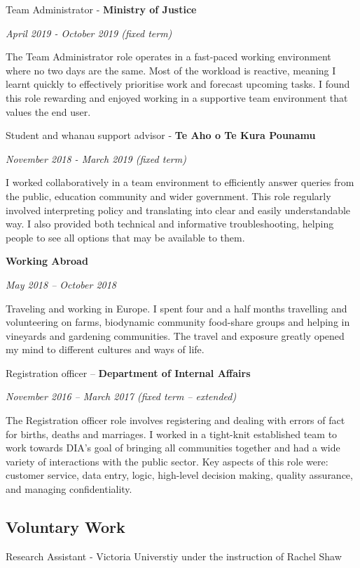 \documentclass[11pt,a4paper,]{moderncv}
\begin{document}
Team Administrator - \textbf{Ministry of Justice} ~

\emph{April 2019 - October 2019 (fixed term)}

The Team Administrator role operates in a fast-paced working environment
where no two days are the same. Most of the workload is reactive,
meaning I learnt quickly to effectively prioritise work and forecast
upcoming tasks. I found this role rewarding and enjoyed working in a
supportive team environment that values the end user.

Student and whanau support advisor - \textbf{Te Aho o Te Kura Pounamu} ~

\emph{November 2018 - March 2019 (fixed term)}

I worked collaboratively in a team environment to efficiently answer
queries from the public, education community and wider government. This
role regularly involved interpreting policy and translating into clear
and easily understandable way. I also provided both technical and
informative troubleshooting, helping people to see all options that may
be available to them.

\textbf{Working Abroad} ~

\emph{May 2018 -- October 2018}

Traveling and working in Europe. I spent four and a half months
travelling and volunteering on farms, biodynamic community food-share
groups and helping in vineyards and gardening communities. The travel
and exposure greatly opened my mind to different cultures and ways of
life.

Registration officer -- \textbf{Department of Internal Affairs} ~

\emph{November 2016 -- March 2017 (fixed term -- extended)}

The Registration officer role involves registering and dealing with
errors of fact for births, deaths and marriages. I worked in a
tight-knit established team to work towards DIA's goal of bringing all
communities together and had a wide variety of interactions with the
public sector. Key aspects of this role were: customer service, data
entry, logic, high-level decision making, quality assurance, and
managing confidentiality.

\hypertarget{voluntary-work}{%
\subsection{Voluntary Work}\label{voluntary-work}}

Research Assistant - Victoria Universtiy under the instruction of Rachel
Shaw ~
\end{document}
